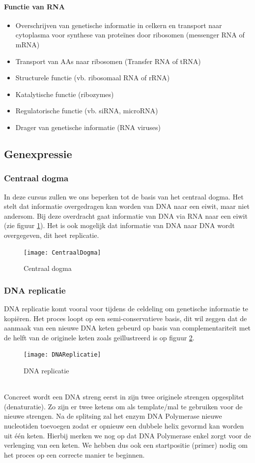 \documentclass[a4paper,kul]{kulakarticle} %
\begin{document}
\paragraph{Functie van RNA}
\begin{itemize}
	\item Overschrijven van genetische informatie in celkern en transport
	naar cytoplasma voor synthese van proteïnes door ribosomen
	(messenger RNA of mRNA)
	\item Transport van AAs naar ribosomen (Transfer RNA of tRNA)
	\item Structurele functie (vb. ribosomaal RNA of rRNA)
	\item Katalytische functie (ribozymes)
	\item Regulatorische functie (vb. siRNA, microRNA)
	\item Drager van genetische informatie (RNA viruses)
\end{itemize}
\subsection{Genexpressie}
\subsubsection{Centraal dogma}
In deze cursus zullen we ons beperken tot de basis van het centraal dogma. Het stelt dat informatie overgedragen kan worden van DNA naar een eiwit, maar niet andersom. Bij deze overdracht gaat informatie van DNA via RNA naar een eiwit (zie figuur \ref{fig:centraaldogma}). Het is ook mogelijk dat informatie van DNA naar DNA wordt overgegeven, dit heet replicatie. 
\begin{figure}[h]
	\centering
	\texttt{[image: CentraalDogma]}
	\caption[Centraal Dogma]{Centraal dogma}
	\label{fig:centraaldogma}
\end{figure}

\subsubsection{DNA replicatie}
DNA replicatie komt vooral voor tijdens de celdeling om genetische informatie te kopiëren. Het proces loopt op een semi-conservatieve basis, dit wil zeggen dat de aanmaak van een nieuwe DNA keten gebeurd op basis van complementariteit met de helft van de originele keten zoals geïllustreerd is op figuur \ref{fig:dnareplicatie}.\\ 
\begin{figure}[h]
	\centering
	\texttt{[image: DNAReplicatie]}
	\caption[DNA replicatie]{DNA replicatie}
	\label{fig:dnareplicatie}
\end{figure}\\
Concreet wordt een DNA streng eerst in zijn twee originele strengen opgesplitst (denaturatie). Zo zijn er twee ketens om als template/mal te gebruiken voor de nieuwe strengen. Na de splitsing zal het enzym DNA Polymerase nieuwe nucleotiden toevoegen zodat er opnieuw een dubbele helix gevormd kan worden uit één keten. Hierbij merken we nog op dat DNA Polymerase enkel zorgt voor de verlenging van een keten. We hebben dus ook een startpositie (primer) nodig om het proces op een correcte manier te beginnen.
\end{document}
